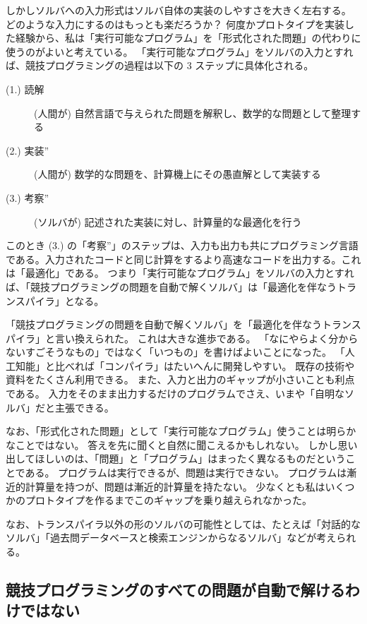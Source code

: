 \documentclass{ltjsarticle}
\begin{document}
しかしソルバへの入力形式はソルバ自体の実装のしやすさを大きく左右する。
どのような入力にするのはもっとも楽だろうか？
何度かプロトタイプを実装した経験から、私は「実行可能なプログラム」を「形式化された問題」の代わりに使うのがよいと考えている。
「実行可能なプログラム」をソルバの入力とすれば、競技プログラミングの過程は以下の 3 ステップに具体化される。

\begin{description}
    \item[(1.) 読解] (人間が) 自然言語で与えられた問題を解釈し、数学的な問題として整理する
    \item[(2.) 実装''] (人間が) 数学的な問題を、計算機上にその愚直解として実装する
    \item[(3.) 考察''] (ソルバが) 記述された実装に対し、計算量的な最適化を行う
\end{description}

このとき (3.) の「考察''」のステップは、入力も出力も共にプログラミング言語である。入力されたコードと同じ計算をするより高速なコードを出力する。これは「最適化」である。
つまり「実行可能なプログラム」をソルバの入力とすれば、「競技プログラミングの問題を自動で解くソルバ」は「最適化を伴なうトランスパイラ」となる。

「競技プログラミングの問題を自動で解くソルバ」を「最適化を伴なうトランスパイラ」と言い換えられた。
これは大きな進歩である。
「なにやらよく分からないすごそうなもの」ではなく「いつもの」を書けばよいことになった。
「人工知能」と比べれば「コンパイラ」はたいへんに開発しやすい。
既存の技術や資料をたくさん利用できる。
また、入力と出力のギャップが小さいことも利点である。
入力をそのまま出力するだけのプログラムでさえ、いまや「自明なソルバ」だと主張できる。

なお、「形式化された問題」として「実行可能なプログラム」使うことは明らかなことではない。
答えを先に聞くと自然に聞こえるかもしれない。
しかし思い出してほしいのは、「問題」と「プログラム」はまったく異なるものだということである。
プログラムは実行できるが、問題は実行できない。
プログラムは漸近的計算量を持つが、問題は漸近的計算量を持たない。
少なくとも私はいくつかのプロトタイプを作るまでこのギャップを乗り越えられなかった。

なお、トランスパイラ以外の形のソルバの可能性としては、たとえば「対話的なソルバ」「過去問データベースと検索エンジンからなるソルバ」などが考えられる。



\subsection{競技プログラミングのすべての問題が自動で解けるわけではない}
\end{document}
